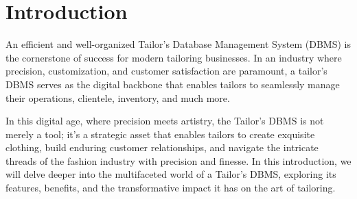\documentclass[12pt, letter paper]{report}
\begin{document}



\renewcommand{\contentsname}{Table of Contents}
\tableofcontents
{}
\listoffigures
{}
\listoftables
{}
\newpage
\thispagestyle{empty}

\chapter{Introduction}
An efficient and well-organized Tailor's Database Management System (DBMS) is the cornerstone of success for modern tailoring businesses. In an industry where precision, customization, and customer satisfaction are paramount, a tailor's DBMS serves as the digital backbone that enables tailors to seamlessly manage their operations, clientele, inventory, and much more.

In this digital age, where precision meets artistry, the Tailor's DBMS is not merely a tool; it's a strategic asset that enables tailors to create exquisite clothing, build enduring customer relationships, and navigate the intricate threads of the fashion industry with precision and finesse. In this introduction, we will delve deeper into the multifaceted world of a Tailor's DBMS, exploring its features, benefits, and the transformative impact it has on the art of tailoring.
\end{document}
